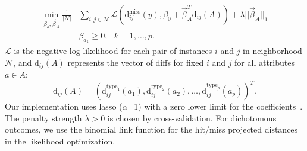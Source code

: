 \documentclass[10pt]{article}
\begin{document}
\begin{equation}\label{eq:glmnetNPDR}
\begin{aligned}
    \min_{\beta_o, \vec{\beta}_A} \frac{1}{|\mathcal{N}|} &  \sum_{i,j \in \mathcal{N}} 
           \mathcal{L} \left(\text{d}^{\text{miss}}_{ij}(y), \beta_0 + \vec{\beta}_A^{T} \text{d}_{ij}(A) \right)
     + \lambda || \vec{\beta}_A ||_1 \\
     & \beta_{a_k} \ge 0, \,\,\,\, k=1,\ldots,p.
     \end{aligned}
\end{equation}
$\mathcal{L}$ is the negative log-likelihood for each pair of instances $i$ and $j$ in neighborhood $\mathcal{N}$, and $\text{d}_{ij}(A)$ represents the vector of diffs for fixed $i$ and $j$ for all attributes $a \in A$: 
\begin{equation}
\text{d}_{ij}(A)= \left( \text{d}^{\text{type}_1}_{ij}(a_1), \text{d}^{\text{type}_2}_{ij}(a_2), \ldots, \text{d}^{\text{type}_p}_{ij}(a_p) \right)^{T}.
\end{equation}
Our implementation uses lasso ($\alpha$=1) with a zero lower limit for the coefficients~\cite{glmnet05}. The penalty strength $\lambda>0$ is chosen by cross-validation. For dichotomous outcomes, we use the binomial link function for the hit/miss projected distances in the likelihood optimization.    
\end{document}
